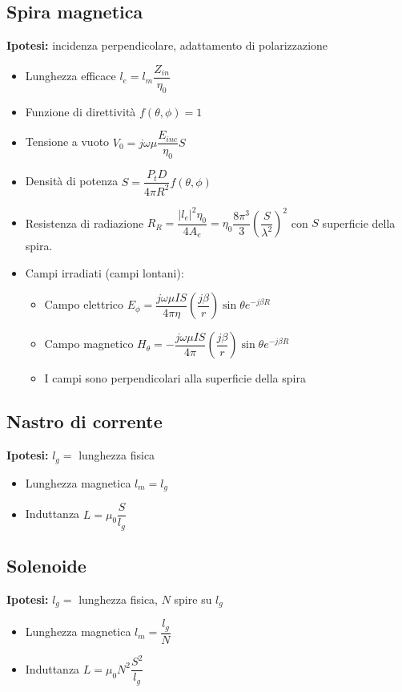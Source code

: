 \documentclass{article}
\begin{document}
\subsection{Spira magnetica}
\textbf{Ipotesi:} incidenza perpendicolare, adattamento di polarizzazione
\begin{itemize}
	\item Lunghezza efficace \(l_e = l_m \dfrac{Z_{in}}{\eta_0}\)
	\item Funzione di direttività \(f(\theta, \phi) = 1 \)
	\item Tensione a vuoto \( V_0 = j \omega \mu \dfrac{E_{inc}}{\eta_0} S \) 
	\item Densità di potenza \( S = \dfrac{P_t D}{4 \pi R^2} f(\theta, \phi) \)
	\item Resistenza di radiazione \( R_R = \dfrac{|l_e|^2 \eta_0}{4 A_e} = \eta_0 \dfrac{8 \pi^3}{3}\left( \dfrac{S}{\lambda^2} \right) ^ 2 \) con \(S\) superficie della spira.
	\item Campi irradiati (campi lontani):
	\begin{itemize}
		\item Campo elettrico \(E_\phi = \dfrac{j \omega \mu I S}{4 \pi \eta} \left( \dfrac{j \beta}{r} \right) \sin\theta e^ {-j \beta R} \)
		\item Campo magnetico \(H_\theta = - \dfrac{j \omega \mu I S}{4 \pi} \left( \dfrac{j \beta}{r} \right) \sin\theta e^ {-j \beta R} \)
		\item I campi sono perpendicolari alla superficie della spira
	\end{itemize}
\end{itemize}

\subsection{Nastro di corrente}
\textbf{Ipotesi:} \(l_g = \) lunghezza fisica 
\begin{itemize}
	\item Lunghezza magnetica \( l_m = l_g \)
	\item Induttanza \( L = \mu_0 \dfrac{S}{l_g} \)
\end{itemize}

\subsection{Solenoide}
\textbf{Ipotesi:} \(l_g = \) lunghezza fisica, \(N\) spire su \(l_g\) 
\begin{itemize}
	\item Lunghezza magnetica \(l_m = \dfrac{l_g}{N} \)
	\item Induttanza \( L = \mu_0 N^2 \dfrac{S^2}{l_g} \)
\end{itemize}
\end{document}
